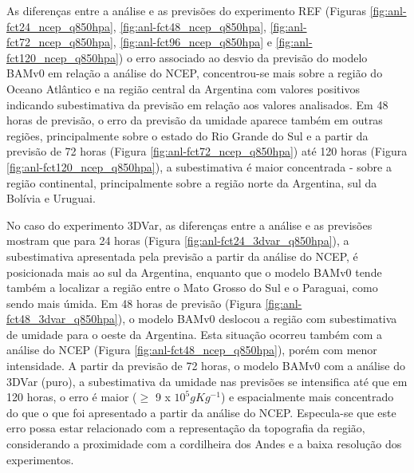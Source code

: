 As diferenças entre a análise e as previsões do experimento REF (Figuras \ref{fig:anl-fct24_ncep_q850hpa}, \ref{fig:anl-fct48_ncep_q850hpa}, \ref{fig:anl-fct72_ncep_q850hpa}, \ref{fig:anl-fct96_ncep_q850hpa} e \ref{fig:anl-fct120_ncep_q850hpa}) o erro associado ao desvio da previsão do modelo BAMv0 em relação a análise do NCEP, concentrou-se mais sobre a região do Oceano Atlântico e na região central da Argentina com valores positivos indicando subestimativa da previsão em relação aos valores analisados. Em 48 horas de previsão, o erro da previsão da umidade aparece também em outras regiões, principalmente sobre o estado do Rio Grande do Sul e a partir da previsão de 72 horas (Figura \ref{fig:anl-fct72_ncep_q850hpa}) até 120 horas (Figura \ref{fig:anl-fct120_ncep_q850hpa}), a subestimativa é maior concentrada - sobre a região continental, principalmente sobre a região norte da Argentina, sul da Bolívia e Uruguai.

No caso do experimento 3DVar, as diferenças entre a análise e as previsões mostram que para 24 horas (Figura \ref{fig:anl-fct24_3dvar_q850hpa}), a subestimativa apresentada pela previsão a partir da análise do NCEP, é posicionada mais ao sul da Argentina, enquanto que o modelo BAMv0 tende também a localizar a região entre o Mato Grosso do Sul e o Paraguai, como sendo mais úmida. Em 48 horas de previsão (Figura \ref{fig:anl-fct48_3dvar_q850hpa}), o modelo BAMv0 deslocou a região com subestimativa de umidade para o oeste da Argentina. Esta situação ocorreu também com a análise do NCEP (Figura \ref{fig:anl-fct48_ncep_q850hpa}), porém com menor intensidade. A partir da previsão de 72 horas, o modelo BAMv0 com a análise do 3DVar (puro), a subestimativa da umidade nas previsões se intensifica até que em 120 horas, o erro é maior ($\geqslant$ 9 x $10^{5} gKg^{-1}$) e espacialmente mais concentrado do que o que foi apresentado a partir da análise do NCEP. Especula-se que este erro possa estar relacionado com a representação da topografia da região, considerando a proximidade com a cordilheira dos Andes e a baixa resolução dos experimentos.

